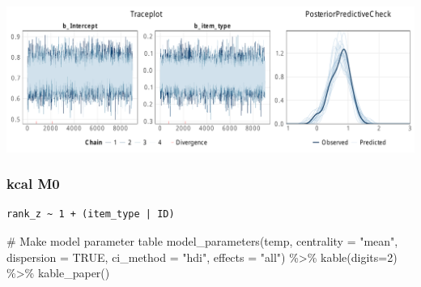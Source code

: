 \documentclass[
  letterpaper,
  DIV=11,
  numbers=noendperiod]{scrartcl}
\newenvironment{Shaded}{\begin{snugshade}}{\end{snugshade}}
\newcommand{\AttributeTok}[1]{\textcolor[rgb]{0.40,0.45,0.13}{#1}}
\newcommand{\CommentTok}[1]{\textcolor[rgb]{0.37,0.37,0.37}{#1}}
\newcommand{\ConstantTok}[1]{\textcolor[rgb]{0.56,0.35,0.01}{#1}}
\newcommand{\DecValTok}[1]{\textcolor[rgb]{0.68,0.00,0.00}{#1}}
\newcommand{\FunctionTok}[1]{\textcolor[rgb]{0.28,0.35,0.67}{#1}}
\newcommand{\NormalTok}[1]{\textcolor[rgb]{0.00,0.23,0.31}{#1}}
\newcommand{\OtherTok}[1]{\textcolor[rgb]{0.00,0.23,0.31}{#1}}
\newcommand{\SpecialCharTok}[1]{\textcolor[rgb]{0.37,0.37,0.37}{#1}}
\newcommand{\StringTok}[1]{\textcolor[rgb]{0.13,0.47,0.30}{#1}}
\begin{document}
\includegraphics{supplement_files/figure-pdf/h2bM1CO2-1.pdf}

\subsubsection{kcal M0}\label{kcal-m0-3}

\begin{Shaded}
\end{Shaded}

\begin{verbatim}
rank_z ~ 1 + (item_type | ID) 
\end{verbatim}

\begin{Shaded}
\begin{Highlighting}[]
\CommentTok{\# Make model parameter table}
\FunctionTok{model\_parameters}\NormalTok{(temp, }\AttributeTok{centrality =} \StringTok{"mean"}\NormalTok{, }\AttributeTok{dispersion =} \ConstantTok{TRUE}\NormalTok{, }
                 \AttributeTok{ci\_method =} \StringTok{"hdi"}\NormalTok{, }\AttributeTok{effects =} \StringTok{"all"}\NormalTok{) }\SpecialCharTok{\%\textgreater{}\%} 
  \FunctionTok{kable}\NormalTok{(}\AttributeTok{digits=}\DecValTok{2}\NormalTok{) }\SpecialCharTok{\%\textgreater{}\%} \FunctionTok{kable\_paper}\NormalTok{()}
\end{Highlighting}
\end{Shaded}
\end{document}

